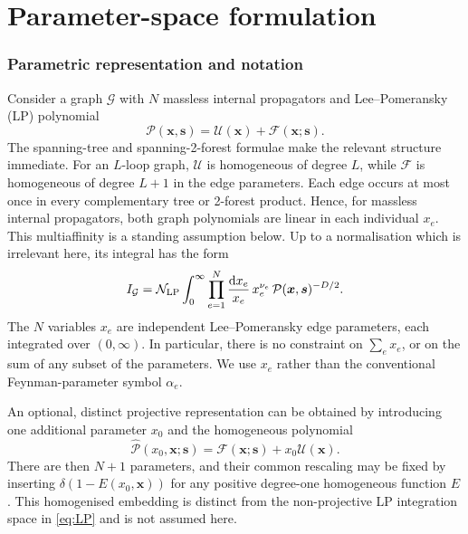 \documentclass[a4paper,11pt]{article}
\newcommand{\x}{\boldsymbol{x}}
\newcommand{\s}{\boldsymbol{s}}
\newcommand{\dd}{\mathrm d}
\begin{document}
\part{Parameter-space formulation}

\section{Parametric representation and notation}
\label{sec:notation}

Consider a graph \(\mathcal G\) with \(N\) massless internal propagators and Lee--Pomeransky
(LP) polynomial
\begin{equation}
  \mathcal P(\x,\s)=\mathcal U(\x)+\mathcal F(\x;\s).
\end{equation}
The spanning-tree and spanning-2-forest formulae make the relevant structure
immediate.  For an \(L\)-loop graph, \(\mathcal U\) is homogeneous of degree
\(L\), while \(\mathcal F\) is homogeneous of degree \(L+1\) in the edge
parameters.  Each edge occurs at most once in every complementary
tree or 2-forest product.  Hence, for massless internal propagators, both
graph polynomials are linear in each individual \(x_e\).  This
multiaffinity is a standing assumption below.
Up to a normalisation which is irrelevant here, its integral has the form
\begin{equation}
 I_{\mathcal G}
 =
 \mathcal N_{\rm LP}
 \int_0^\infty
 \prod_{e=1}^{N}\frac{\dd x_e}{x_e}\,x_e^{\nu_e}\,
 \mathcal P(\x,\s)^{-D/2}.
\label{eq:LP}
\end{equation}
The \(N\) variables \(x_e\) are independent Lee--Pomeransky edge parameters,
each integrated over \((0,\infty)\).  In particular, there is no constraint
on \(\sum_e x_e\), or on the sum of any subset of the parameters.  We use
\(x_e\) rather than the conventional Feynman-parameter symbol \(\alpha_e\).

An optional, distinct projective representation can be obtained by
introducing one additional parameter \(x_0\) and the homogeneous polynomial
\begin{equation}
 \widehat{\mathcal P}(x_0,\x;\s)
 =\mathcal F(\x;\s)+x_0\mathcal U(\x).
\label{eq:homogenised-LP}
\end{equation}
There are then \(N+1\) parameters, and their common rescaling may be fixed by
inserting \(\delta(1-E(x_0,\x))\) for any positive degree-one homogeneous
function \(E\).  This homogenised embedding is distinct from the
non-projective LP integration space in \eqref{eq:LP} and is not assumed here.
\end{document}

